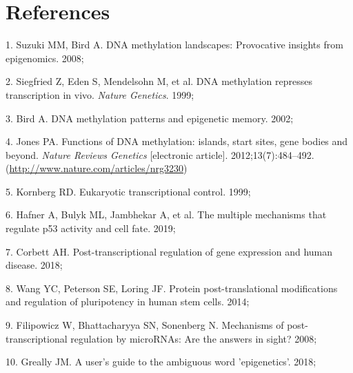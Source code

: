 \documentclass[11pt,twoside]{bristolthesis}
\newenvironment{cslreferences}%
  {}%
  {\par}
\begin{document}
\backmatter

\hypertarget{references}{%
\chapter*{References}\label{references}}


\noindent

\setlength{\parindent}{-0.20in}
\setlength{\leftskip}{0.20in}
\setlength{\parskip}{8pt}

\hypertarget{refs}{}
\begin{cslreferences}
\leavevmode\hypertarget{ref-Suzuki2008}{}%
1. Suzuki MM, Bird A. DNA methylation landscapes: Provocative insights from epigenomics. 2008;

\leavevmode\hypertarget{ref-Siegfried1999}{}%
2. Siegfried Z, Eden S, Mendelsohn M, et al. DNA methylation represses transcription in vivo. \emph{Nature Genetics}. 1999;

\leavevmode\hypertarget{ref-Bird2002}{}%
3. Bird A. DNA methylation patterns and epigenetic memory. 2002;

\leavevmode\hypertarget{ref-Jones2012}{}%
4. Jones PA. Functions of DNA methylation: islands, start sites, gene bodies and beyond. \emph{Nature Reviews Genetics} {[}electronic article{]}. 2012;13(7):484--492. (\url{http://www.nature.com/articles/nrg3230})

\leavevmode\hypertarget{ref-Kornberg1999}{}%
5. Kornberg RD. Eukaryotic transcriptional control. 1999;

\leavevmode\hypertarget{ref-Hafner2019}{}%
6. Hafner A, Bulyk ML, Jambhekar A, et al. The multiple mechanisms that regulate p53 activity and cell fate. 2019;

\leavevmode\hypertarget{ref-Corbett2018}{}%
7. Corbett AH. Post-transcriptional regulation of gene expression and human disease. 2018;

\leavevmode\hypertarget{ref-Wang2014}{}%
8. Wang YC, Peterson SE, Loring JF. Protein post-translational modifications and regulation of pluripotency in human stem cells. 2014;

\leavevmode\hypertarget{ref-Filipowicz2008}{}%
9. Filipowicz W, Bhattacharyya SN, Sonenberg N. Mechanisms of post-transcriptional regulation by microRNAs: Are the answers in sight? 2008;

\leavevmode\hypertarget{ref-Greally2018}{}%
10. Greally JM. A user's guide to the ambiguous word 'epigenetics'. 2018;


\end{cslreferences}
\end{document}
